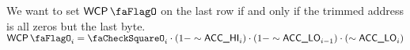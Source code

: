 We want to set $\wcpFlag$ on the last row if and only if the trimmed address is all zeros but the last byte. 
$\wcpFlag_{i} = \done_{i} \cdot (1 - \sim \acc{HI}_{i}) \cdot (1 - \sim \acc{LO}_{i-1}) \cdot (\sim \acc{LO}_{i})$ 